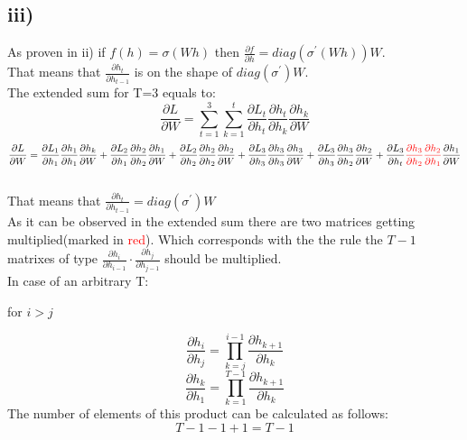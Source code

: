 \subsection*{iii)}
As proven in ii) if $f(h) = \sigma(Wh)$ then $\frac{\partial f}{\partial h} = diag(\sigma^{\prime}(Wh))W$. \\
That means that $\frac{\partial h_t}{\partial h_{t-1}}$ is on the shape of $diag(\sigma^{\prime})W$.\\
The extended sum for T=3 equals to:
\[\frac{\partial L}{\partial W} = \sum_{t=1}^{3} 
\sum_{k=1}^{t} 
\frac{\partial L_t}{\partial h_t} 
\frac{\partial h_t}{\partial h_k} 
\frac{\partial h_k}{\partial W} \]
\[\frac{\partial L}{\partial W} = 
\frac{\partial L_1}{\partial h_1} 
\frac{\partial h_1}{\partial h_1} 
\frac{\partial h_k}{\partial W}
+
\frac{\partial L_2}{\partial h_1} 
\frac{\partial h_2}{\partial h_2} 
\frac{\partial h_1}{\partial W}
+
\frac{\partial L_2}{\partial h_2} 
\frac{\partial h_2}{\partial h_2} 
\frac{\partial h_2}{\partial W}
+
\frac{\partial L_3}{\partial h_3} 
\frac{\partial h_3}{\partial h_3} 
\frac{\partial h_3}{\partial W}
+
\frac{\partial L_3}{\partial h_3} 
\frac{\partial h_3}{\partial h_2} 
\frac{\partial h_2}{\partial W}
+
\frac{\partial L_3}{\partial h_t} 
\textcolor{red}{\frac{\partial h_3}{\partial h_2} 
\frac{\partial h_2}{\partial h_1}}
\frac{\partial h_1}{\partial W}\]\\
That means that $\frac{\partial h_t}{\partial h_{t-1}} = diag(\sigma^{\prime})W$\\
As it can be observed in the extended sum there are two matrices getting multiplied(marked in \textcolor{red}{red}). Which corresponds with the the rule the $T - 1$ matrixes of type $\frac{\partial h_i}{\partial h_{i-1}} \cdot \frac{\partial h_j}{\partial h_{j-1}}$
should be multiplied.\\
In case of an arbitrary T:\\
\begin{center}
    for $i>j$
\end{center}
\[\frac{\partial h_i}{\partial h_j} = \prod_{k=j}^{i-1} \frac{\partial h_{k+1}}{\partial h_k}\] 
\[\frac{\partial h_k}{\partial h_1} = \prod_{k=1}^{T-1} \frac{\partial h_{k+1}}{\partial h_k}\]
The number of elements of this product can be calculated as follows:\\
\[T-1-1+1 = T -1\] 


